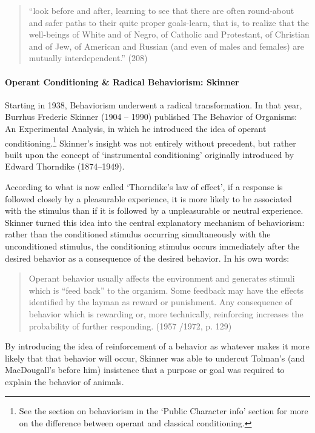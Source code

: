 \begin{quote}

``look before and after, learning to see that there are often round-about and safer paths to their quite proper goals-learn, that is, to realize that the well-beings of White and of Negro, of Catholic and Protestant, of Christian and of Jew, of American and Russian (and even of males and females) are mutually interdependent.'' (208) 
\end{quote}

\paragraph{Operant Conditioning \& Radical Behaviorism: Skinner}
\label{operantconditioningradicalbehaviorism:skinner}

Starting in 1938, Behaviorism underwent a radical transformation. In that year, Burrhus Frederic Skinner (1904 – 1990) published The Behavior of Organisms: An Experimental Analysis, in which he introduced the idea of operant conditioning.\footnote{See the section on behaviorism in the `Public Character info' section for more on the difference between operant and classical conditioning.} Skinner's insight was not entirely without precedent, but rather built upon the concept of `instrumental conditioning' originally introduced by Edward Thorndike (1874--1949). 

According to what is now called `Thorndike's law of effect', if a response is followed closely by a pleasurable experience, it is more likely to be associated with the stimulus than if it is followed by a unpleasurable or neutral experience. Skinner turned this idea into the central explanatory mechanism of behaviorism: rather than the conditioned stimulus occurring simultaneously with the unconditioned stimulus, the conditioning stimulus occurs immediately after the desired behavior as a consequence of the desired behavior. In his own words:

\begin{quote}

Operant behavior usually affects the environment and generates stimuli which is ``feed back'' to the organism. Some feedback may have the effects identified by the layman as reward or punishment. Any consequence of behavior which is rewarding or, more technically, reinforcing increases the probability of further responding. (1957 \slash  1972, p. 129)
\end{quote}

By introducing the idea of reinforcement of a behavior as whatever makes it more likely that that behavior will occur, Skinner was able to undercut Tolman's (and MacDougall's before him) insistence that a purpose or goal was required to explain the behavior of animals.

